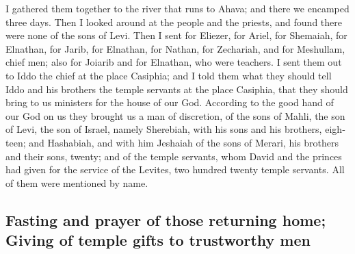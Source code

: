 \begin{paracol}{2}
\begin{otherlanguage}{english}
 I gathered them together to the river that runs to
Ahava; and there we encamped three days. Then I looked around at the
people and the priests, and found there were none of the sons of Levi.
 Then I sent for Eliezer, for Ariel, for Shemaiah, for
Elnathan, for Jarib, for Elnathan, for Nathan, for Zechariah, and for
Meshullam, chief men; also for Joiarib and for Elnathan, who were
teachers.  I sent them out to Iddo the chief at the place
Casiphia; and I told them what they should tell Iddo and his brothers
the temple servants at the place Casiphia, that they should bring to us
ministers for the house of our God.  According to the
good hand of our God on us they brought us a man of discretion, of the
sons of Mahli, the son of Levi, the son of Israel, namely Sherebiah,
with his sons and his brothers, eighteen;  and Hashabiah,
and with him Jeshaiah of the sons of Merari, his brothers and their
sons, twenty;  and of the temple servants, whom David and
the princes had given for the service of the Levites, two hundred twenty
temple servants. All of them were mentioned by name.

\hypertarget{fasting-and-prayer-of-those-returning-home-giving-of-temple-gifts-to-trustworthy-men}{%
\subsection{Fasting and prayer of those returning home; Giving of temple
gifts to trustworthy
men}\label{fasting-and-prayer-of-those-returning-home-giving-of-temple-gifts-to-trustworthy-men}}


\end{otherlanguage}
\end{paracol}
